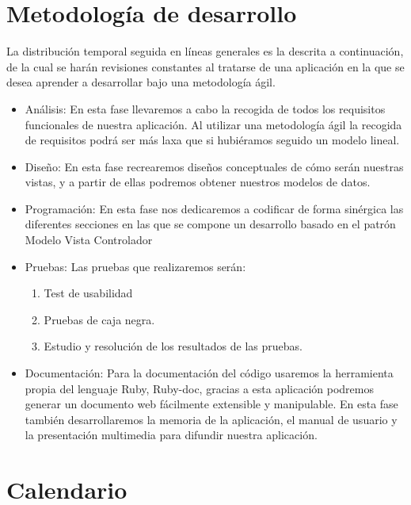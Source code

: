 

\section{Metodología de desarrollo}
La distribución temporal seguida en líneas generales es la descrita a
continuación, de la cual se harán revisiones constantes al tratarse de una
aplicación en la que se desea aprender a desarrollar bajo una metodología ágil.
\begin{itemize}
\item Análisis: En esta fase llevaremos a cabo la recogida de todos los
  requisitos funcionales de nuestra aplicación. Al utilizar una metodología ágil
  la recogida de requisitos podrá ser más laxa que si hubiéramos seguido un
  modelo lineal.
\item Diseño: En esta fase recrearemos diseños conceptuales de cómo serán
  nuestras vistas, y a partir de ellas podremos obtener nuestros modelos de
  datos.
\item Programación: En esta fase nos dedicaremos a codificar de forma sinérgica
  las diferentes secciones en las que se compone un desarrollo basado en el
  patrón Modelo Vista Controlador
\item Pruebas: Las pruebas que realizaremos serán:
  \begin{enumerate}
  \item Test de usabilidad
  \item Pruebas de caja negra.
  \item Estudio y resolución de los resultados de las pruebas.
  \end{enumerate}
\item Documentación: Para la documentación del código usaremos la herramienta
  propia del lenguaje Ruby, Ruby-doc, gracias a esta aplicación podremos generar
  un documento web fácilmente extensible y manipulable. En esta fase también
  desarrollaremos la memoria de la aplicación, el manual de usuario y la
  presentación multimedia para difundir nuestra aplicación.
\end{itemize}

\section{Calendario}

